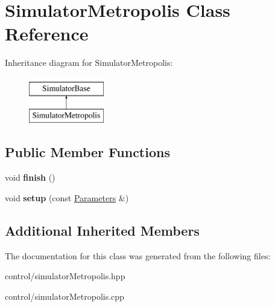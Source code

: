\hypertarget{classSimulatorMetropolis}{}\section{Simulator\+Metropolis Class Reference}
\label{classSimulatorMetropolis}
Inheritance diagram for Simulator\+Metropolis\+:\begin{figure}[H]
\begin{center}
\leavevmode
\includegraphics[height=2.000000cm]{classSimulatorMetropolis}
\end{center}
\end{figure}
\subsection*{Public Member Functions}
\begin{DoxyCompactItemize}
\item 
\mbox{\label{classSimulatorMetropolis_ac9864831658bddb8d5ba9651c8614cbe}} 
void {\bfseries finish} ()
\item 
\mbox{\label{classSimulatorMetropolis_aaf39e8c5ce23362bbb8a4f2b1cf19dda}} 
void {\bfseries setup} (const \mbox{\hyperlink{classParameters}{Parameters}} \&)
\end{DoxyCompactItemize}
\subsection*{Additional Inherited Members}


The documentation for this class was generated from the following files\+:\begin{DoxyCompactItemize}
\item 
control/simulator\+Metropolis.\+hpp\item 
control/simulator\+Metropolis.\+cpp\end{DoxyCompactItemize}
